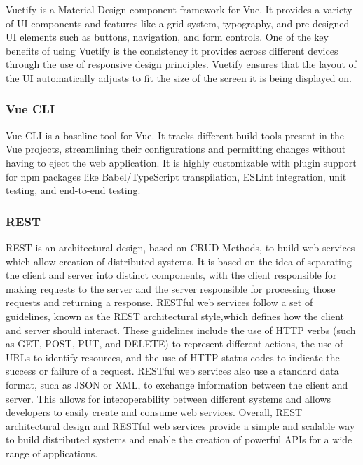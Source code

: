 \documentclass[
a4paper,
11pt
]{article}
\begin{document}
	Vuetify is a Material Design component framework for \ac{Vue}\cite{noauthor_material_nodate}. It provides a variety of \ac{UI} components and features like a grid system, typography, and pre-designed \ac{UI} elements such as buttons, navigation, and form controls. One of the key benefits of using Vuetify is the consistency it provides across different devices through the use of responsive design principles. Vuetify ensures that the layout of the \ac{UI} automatically adjusts to fit the size of the screen it is being displayed on.\cite{noauthor_why_nodate}
	
	\subsubsection{Vue CLI}
	
	Vue CLI is a baseline tool for \ac{Vue}. It tracks different build tools present in the \ac{Vue} projects, streamlining their configurations and permitting changes without having to eject the web application. It is highly customizable with plugin support for \ac{npm} packages like Babel/TypeScript transpilation, ESLint integration, unit testing, and end-to-end testing.\cite{noauthor_overview_nodate-1}
	
	\subsubsection{REST}
	\ac{REST} is an architectural design, based on \ac{CRUD} Methods, to build web services which allow creation of distributed systems. It is based on the idea of separating the client and server into distinct components, with the client responsible for making requests to the server and the server responsible for processing those requests and returning a response. \ac{REST}ful web services follow a set of guidelines, known as the \ac{REST} architectural style,which defines how the client and server should interact. These guidelines include the use of \ac{HTTP} verbs (such as GET, POST, PUT, and DELETE) to represent different actions, the use of \acp{URL} to identify resources, and the use of \ac{HTTP} status codes to indicate the success or failure of a request. \ac{REST}ful web services also use a standard data format, such as \ac{JSON} or \ac{XML}, to exchange information between the client and server. This allows for interoperability between different systems and allows developers to easily create and consume web services. Overall, \ac{REST} architectural design and \ac{REST}ful web services provide a simple and scalable way to build distributed systems and enable the creation of powerful \acp{API} for a wide range of applications.\cite{noauthor_what_nodate}
\end{document}
